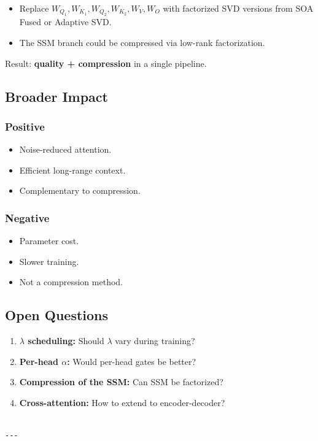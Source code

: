 \begin{itemize}
\item Replace $W_{Q_1}, W_{K_1}, W_{Q_2}, W_{K_2}, W_V, W_O$ with factorized SVD
  versions from SOA Fused or Adaptive SVD.
\item The SSM branch could be compressed via low-rank factorization.

\end{itemize}
Result: \textbf{quality + compression} in a single pipeline.

\subsection{Broader Impact}

\subsubsection{Positive}
\begin{itemize}
\item Noise-reduced attention.
\item Efficient long-range context.
\item Complementary to compression.

\end{itemize}
\subsubsection{Negative}
\begin{itemize}
\item Parameter cost.
\item Slower training.
\item Not a compression method.

\end{itemize}
\subsection{Open Questions}

\begin{enumerate}
\item \textbf{$\lambda$ scheduling:} Should $\lambda$ vary during training?
\item \textbf{Per-head $\alpha$:} Would per-head gates be better?
\item \textbf{Compression of the SSM:} Can SSM be factorized?
\item \textbf{Cross-attention:} How to extend to encoder-decoder?
\end{enumerate}
\begin{lstlisting}

---
\end{lstlisting}

